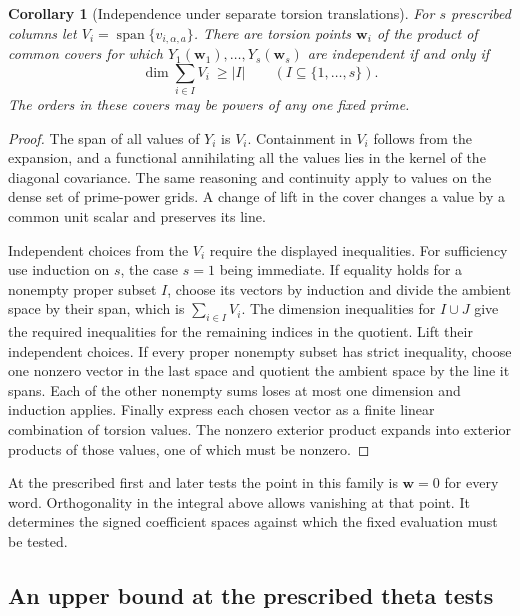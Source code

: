 \documentclass[a4paper,11pt]{article}
\newtheorem{corollary}[proposition]{Corollary}
\theoremstyle{definition}
\theoremstyle{remark}
\numberwithin{equation}{section}
\begin{document}
\begin{corollary}[Independence under separate torsion translations]\leavevmode
\label{cor:signedspan478}
For \(s\) prescribed columns let \(V_i=\operatorname{span}
\{v_{i,\alpha,a}\}\). There are torsion points \(\boldsymbol w_i\)
of the product of common covers for which
\(Y_1(\boldsymbol w_1),\ldots,Y_s(\boldsymbol w_s)\) are
independent if and only if
\[
      \dim\sum_{i\in I}V_i\ \ge |I|
        \qquad(I\subseteq\{1,\ldots,s\}).
\]
The orders in these covers may be powers of any one fixed prime.
\end{corollary}
\begin{proof}
The span of all values of \(Y_i\) is \(V_i\). Containment in
\(V_i\) follows from the expansion, and a functional annihilating
all the values lies in the kernel of the diagonal covariance.
The same reasoning and continuity apply to values on the dense
set of prime-power grids. A change of lift in the cover changes
a value by a common unit scalar and preserves its line.

Independent choices from the \(V_i\) require the displayed
inequalities. For sufficiency use induction on \(s\), the case
\(s=1\) being immediate. If equality holds for a nonempty proper
subset \(I\), choose its vectors by induction and divide the
ambient space by their span, which is \(\sum_{i\in I}V_i\).
The dimension inequalities for \(I\cup J\) give the required
inequalities for the remaining indices in the quotient. Lift
their independent choices. If every proper nonempty subset has
strict inequality, choose one nonzero vector in the last space
and quotient the ambient space by the line it spans. Each of the
other nonempty sums loses at most one dimension and induction
applies. Finally express each chosen vector as a finite linear
combination of torsion values. The nonzero exterior product
expands into exterior products of those values, one of which
must be nonzero.
\end{proof}

At the prescribed first and later tests the point in this family
is \(\boldsymbol w=0\) for every word. Orthogonality in the
integral above allows vanishing at that point. It determines the
signed coefficient spaces against which the fixed evaluation
must be tested.


\subsection{An upper bound at the prescribed theta tests}
\label{sec:fixedexterior479}
\end{document}
